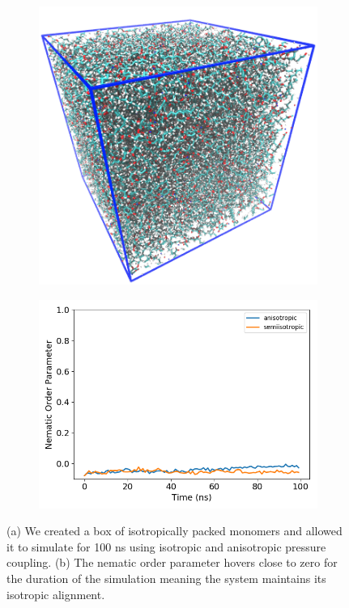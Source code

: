 \documentclass{article}
\begin{document}
  \begin{figure}[!htb]
  \centering
  \begin{subfigure}{0.45\textwidth}
  \includegraphics[width=\textwidth]{isotropic_box.png}
  \caption{}\label{fig:isotropic_box}
  \end{subfigure}
  \begin{subfigure}{0.45\textwidth}
  \includegraphics[width=\textwidth]{nematic_isotropic.png}
  \caption{}\label{fig:nematic_isotropic}
  \end{subfigure}
  \caption{(a) We created a box of isotropically packed monomers and allowed it to simulate
  for 100 ns using isotropic and anisotropic pressure coupling. (b) The nematic order 
  parameter hovers close to zero for the duration of the simulation meaning the system
  maintains its isotropic alignment.}\label{fig:self_assembly}
  \end{figure}
\end{document}
